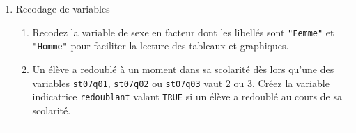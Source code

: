 \documentclass[12pt,twosided, notitlepage]{book}
\newenvironment{Shaded}{}{}
\newcommand{\KeywordTok}[1]{\textcolor[rgb]{0.00,0.00,1.00}{#1}}
\newcommand{\DataTypeTok}[1]{#1}
\newcommand{\StringTok}[1]{\textcolor[rgb]{0.00,0.50,0.50}{#1}}
\newcommand{\CommentTok}[1]{\textcolor[rgb]{0.00,0.50,0.00}{#1}}
\newcommand{\OperatorTok}[1]{#1}
\newcommand{\NormalTok}[1]{#1}
\newif \ifsol
\renewenvironment{Shaded}{\begin{snugshade}}{\end{snugshade}}
\begin{document}
\begin{enumerate}
\begin{enumerate}
    \begin{center} \rule{0.5\linewidth}{\linethickness}\end{center}

    \bigskip  \fi 
  \end{enumerate}
\item
  Recodage de variables

  \begin{enumerate}
  \def\labelenumii{\roman{enumii}.}
  \item
    Recodez la variable de sexe en facteur  dont
    les libellés sont \texttt{"Femme"} et \texttt{"Homme"} pour
    faciliter la lecture des tableaux et graphiques.

    \ifsol 

    \begin{center} \rule{0.5\linewidth}{\linethickness}\end{center}

\begin{Shaded}
\begin{Highlighting}[]
\CommentTok{# Création de la variable sexe recodée}
\NormalTok{stu2}\OperatorTok{$}\NormalTok{sexe <-}\StringTok{ }\KeywordTok{factor}\NormalTok{(stu2}\OperatorTok{$}\NormalTok{st04q01, }\DataTypeTok{labels =} \KeywordTok{c}\NormalTok{(}\StringTok{"Femme"}\NormalTok{, }\StringTok{"Homme"}\NormalTok{))}
\end{Highlighting}
\end{Shaded}

    \begin{center} \rule{0.5\linewidth}{\linethickness}\end{center}

    \bigskip  \fi 
  \item
    Un élève a redoublé à un moment dans sa scolarité dès lors qu'une
    des variables \texttt{st07q01}, \texttt{st07q02} ou \texttt{st07q03}
    vaut 2 ou 3. Créez la variable indicatrice \texttt{redoublant}
    valant \texttt{TRUE} si un élève a redoublé au cours de sa
    scolarité.

    \ifsol 

    \begin{center} \rule{0.5\linewidth}{\linethickness}\end{center}


\end{enumerate}
\end{enumerate}
\end{document}
